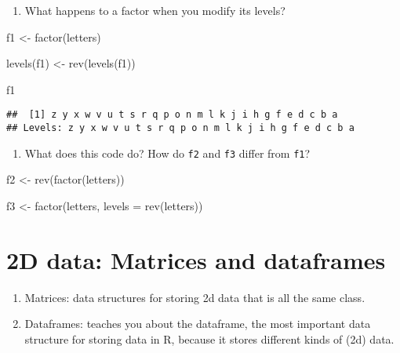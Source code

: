 \documentclass[
]{book}
\newenvironment{Shaded}{\begin{snugshade}}{\end{snugshade}}
\newcommand{\AttributeTok}[1]{\textcolor[rgb]{0.77,0.63,0.00}{#1}}
\newcommand{\FunctionTok}[1]{\textcolor[rgb]{0.00,0.00,0.00}{#1}}
\newcommand{\NormalTok}[1]{#1}
\newcommand{\OtherTok}[1]{\textcolor[rgb]{0.56,0.35,0.01}{#1}}
\providecommand{\tightlist}{%
  \setlength{\itemsep}{0pt}\setlength{\parskip}{0pt}}
\begin{document}
\begin{enumerate}
\def\labelenumi{\arabic{enumi}.}
\tightlist
\item
  What happens to a factor when you modify its levels?
\end{enumerate}

\begin{Shaded}
\begin{Highlighting}[]
\NormalTok{f1 }\OtherTok{\textless{}{-}} \FunctionTok{factor}\NormalTok{(letters)}

\FunctionTok{levels}\NormalTok{(f1) }\OtherTok{\textless{}{-}} \FunctionTok{rev}\NormalTok{(}\FunctionTok{levels}\NormalTok{(f1))}

\NormalTok{f1}
\end{Highlighting}
\end{Shaded}

\begin{verbatim}
##  [1] z y x w v u t s r q p o n m l k j i h g f e d c b a
## Levels: z y x w v u t s r q p o n m l k j i h g f e d c b a
\end{verbatim}

\begin{enumerate}
\def\labelenumi{\arabic{enumi}.}
\setcounter{enumi}{1}
\tightlist
\item
  What does this code do? How do \texttt{f2} and \texttt{f3} differ from \texttt{f1}?
\end{enumerate}

\begin{Shaded}
\begin{Highlighting}[]
\NormalTok{f2 }\OtherTok{\textless{}{-}} \FunctionTok{rev}\NormalTok{(}\FunctionTok{factor}\NormalTok{(letters))}

\NormalTok{f3 }\OtherTok{\textless{}{-}} \FunctionTok{factor}\NormalTok{(letters, }\AttributeTok{levels =} \FunctionTok{rev}\NormalTok{(letters))}
\end{Highlighting}
\end{Shaded}

\hypertarget{d-data-matrices-and-dataframes}{%
\section{2D data: Matrices and dataframes}\label{d-data-matrices-and-dataframes}}

\begin{enumerate}
\def\labelenumi{\arabic{enumi}.}
\tightlist
\item
  Matrices: data structures for storing 2d data that is all the same class.
\item
  Dataframes: teaches you about the dataframe, the most important data structure for storing data in R, because it stores different kinds of (2d) data.
\end{enumerate}
\end{document}
